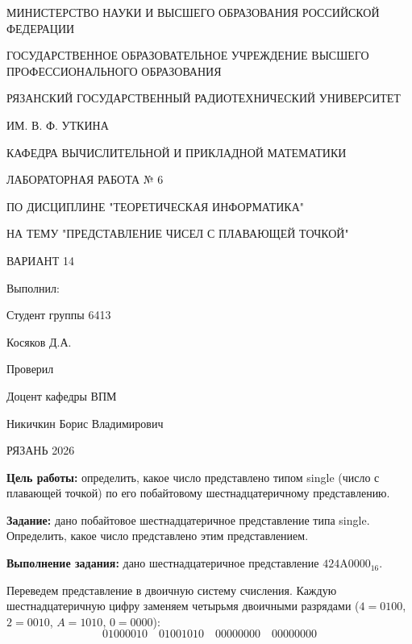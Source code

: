 \documentclass[a4paper, 12pt]{article}
\begin{document}
\begin{center}
    МИНИСТЕРСТВО НАУКИ И ВЫСШЕГО ОБРАЗОВАНИЯ РОССИЙСКОЙ ФЕДЕРАЦИИ

    ГОСУДАРСТВЕННОЕ ОБРАЗОВАТЕЛЬНОЕ УЧРЕЖДЕНИЕ ВЫСШЕГО ПРОФЕССИОНАЛЬНОГО ОБРАЗОВАНИЯ

    РЯЗАНСКИЙ ГОСУДАРСТВЕННЫЙ РАДИОТЕХНИЧЕСКИЙ УНИВЕРСИТЕТ

    ИМ. В. Ф. УТКИНА

    КАФЕДРА ВЫЧИСЛИТЕЛЬНОЙ И ПРИКЛАДНОЙ МАТЕМАТИКИ
\end{center}

\vspace{5 cm}

\begin{center}
    ЛАБОРАТОРНАЯ РАБОТА № 6

    ПО ДИСЦИПЛИНЕ "ТЕОРЕТИЧЕСКАЯ ИНФОРМАТИКА"

    НА ТЕМУ "ПРЕДСТАВЛЕНИЕ ЧИСЕЛ С ПЛАВАЮЩЕЙ ТОЧКОЙ"

    ВАРИАНТ 14

\end{center}

\vspace{7 cm}

\begin{flushright}
    Выполнил:

    Студент группы 6413

    Косяков Д.А.

    Проверил

    Доцент кафедры ВПМ

    Никичкин Борис Владимирович
\end{flushright}

\begin{center}
    РЯЗАНЬ 2026
\end{center}

\pagebreak

\textbf{ Цель работы:} определить, какое число представлено типом single (число с плавающей точкой) по его побайтовому шестнадцатеричному представлению.

\textbf{ Задание:} дано побайтовое шестнадцатеричное представление типа single.
Определить, какое число представлено этим представлением.

\textbf{ Выполнение задания:} дано шестнадцатеричное представление $\mathrm{424A0000}_{16}$.

Переведем представление в двоичную систему счисления. Каждую шестнадцатеричную цифру
заменяем четырьмя двоичными разрядами ($4 = 0100$, $2 = 0010$, $A = 1010$, $0 = 0000$):
$$01000010 \quad 01001010 \quad 00000000 \quad 00000000$$
\end{document}
